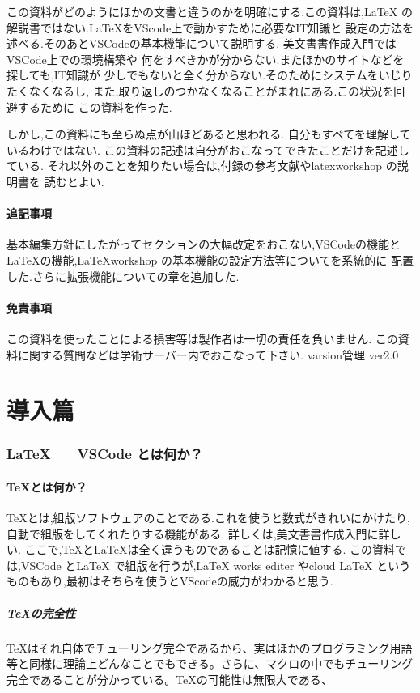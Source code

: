 \documentclass{ltjsarticle}
\begin{document}
この資料がどのようにほかの文書と違うのかを明確にする.この資料は,\LaTeX
の解説書ではない.\LaTeX をVScode上で動かすために必要なIT知識と
設定の方法を述べる.そのあとVSCodeの基本機能について説明する.
美文書書作成入門\cite{美文書本}ではVSCode上での環境構築や
何をすべきかが分からない.またほかのサイトなどを探しても,IT知識が
少しでもないと全く分からない.そのためにシステムをいじりたくなくなるし,
また,取り返しのつかなくなることがまれにある.この状況を回避するために
この資料を作った.

しかし,この資料にも至らぬ点が山ほどあると思われる.
自分もすべてを理解しているわけではない.
この資料の記述は自分がおこなってできたことだけを記述している.
それ以外のことを知りたい場合は,付録の参考文献やlatexworkshop の説明書を
読むとよい.

\subsection{追記事項}
基本編集方針にしたがってセクションの大幅改定をおこない,VSCodeの機能と
LaTeXの機能,LaTeXworkshop の基本機能の設定方法等についてを系統的に
配置した.さらに拡張機能についての章を追加した.

\subsection{免責事項}
この資料を使ったことによる損害等は製作者は一切の責任を負いません.
この資料に関する質問などは学術サーバー内でおこなって下さい.
varsion管理  ver2.0
\tableofcontents
\part{導入篇}
\section{\LaTeX　　VSCode とは何か？}
\subsection{\TeX とは何か？}
\TeX とは,組版ソフトウェアのことである.これを使うと数式がきれいにかけたり,
自動で組版をしてくれたりする機能がある.
詳しくは,美文書書作成入門\cite{美文書本}に詳しい.
ここで,\TeX と\LaTeX は全く違うものであることは記憶に値する.
この資料では,VSCode とLaTeX で組版を行うが,LaTeX works editer やcloud LaTeX 
というものもあり,最初はそちらを使うとVScodeの威力がわかると思う.
\subsubsection*{\TeX の完全性}
\TeX はそれ自体でチューリング完全であるから、実はほかのプログラミング用語等と同様に理論上どんなことでもできる。さらに、マクロの中でもチューリング完全であることが分かっている。\TeX の可能性は無限大である、
\end{document}
